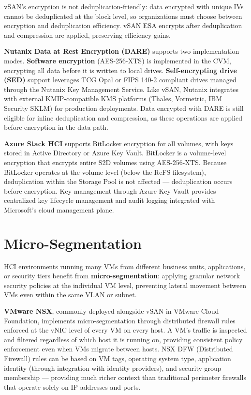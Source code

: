 vSAN's encryption is not deduplication-friendly: data encrypted with unique IVs cannot be deduplicated at the block level, so organizations must choose between encryption and deduplication efficiency. vSAN ESA encrypts after deduplication and compression are applied, preserving efficiency gains.

\textbf{Nutanix Data at Rest Encryption (DARE)} supports two implementation modes. \textbf{Software encryption} (AES-256-XTS) is implemented in the CVM, encrypting all data before it is written to local drives. \textbf{Self-encrypting drive (SED)} support leverages TCG Opal or FIPS 140-2 compliant drives managed through the Nutanix Key Management Service. Like vSAN, Nutanix integrates with external KMIP-compatible KMS platforms (Thales, Vormetric, IBM Security SKLM) for production deployments. Data encrypted with DARE is still eligible for inline deduplication and compression, as these operations are applied before encryption in the data path.

\textbf{Azure Stack HCI} supports BitLocker encryption for all volumes, with keys stored in Active Directory or Azure Key Vault. BitLocker is a volume-level encryption that encrypts entire S2D volumes using AES-256-XTS. Because BitLocker operates at the volume level (below the ReFS filesystem), deduplication within the Storage Pool is not affected --- deduplication occurs before encryption. Key management through Azure Key Vault provides centralized key lifecycle management and audit logging integrated with Microsoft's cloud management plane.

\section{Micro-Segmentation}
HCI environments running many VMs from different business units, applications, or security tiers benefit from \textbf{micro-segmentation}: applying granular network security policies at the individual VM level, preventing lateral movement between VMs even within the same VLAN or subnet.

\textbf{VMware NSX}, commonly deployed alongside vSAN in VMware Cloud Foundation, implements micro-segmentation through distributed firewall rules enforced at the vNIC level of every VM on every host. A VM's traffic is inspected and filtered regardless of which host it is running on, providing consistent policy enforcement even when VMs migrate between hosts. NSX DFW (Distributed Firewall) rules can be based on VM tags, operating system type, application identity (through integration with identity providers), and security group membership --- providing much richer context than traditional perimeter firewalls that operate solely on IP addresses and ports.

